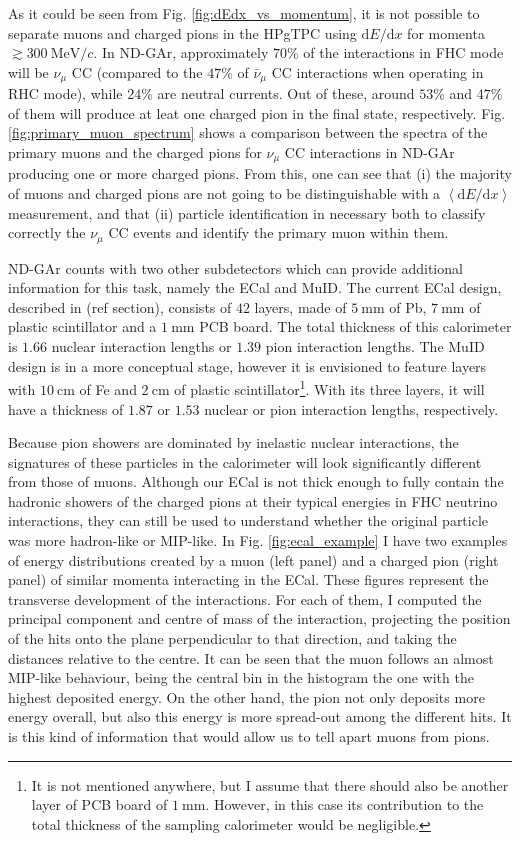 As it could be seen from Fig. \ref{fig:dEdx_vs_momentum}, it is not possible to separate muons and charged pions in the HPgTPC using $\mathrm{d}E/\mathrm{d}x$ for momenta $\gtrsim 300~\mathrm{MeV}/c$. In ND-GAr, approximately $70\%$ of the interactions in FHC mode will be $\nu_{\mu}$ CC (compared to the $47\%$ of $\bar{\nu}_{\mu}$ CC interactions when operating in RHC mode), while $24\%$ are neutral currents. Out of these, around $53\%$ and $47\%$ of them will produce at leat one charged pion in the final state, respectively. Fig. \ref{fig:primary_muon_spectrum} shows a comparison between the spectra of the primary muons and the charged pions for $\nu_{\mu}$ CC interactions in ND-GAr producing one or more charged pions. From this, one can see that (i) the majority of muons and charged pions are not going to be distinguishable with a $\left<\mathrm{d}E/\mathrm{d}x\right>$ measurement, and that (ii) particle identification in necessary both to classify correctly the $\nu_{\mu}$ CC events and identify the primary muon within them.

ND-GAr counts with two other subdetectors which can provide additional information for this task, namely the ECal and MuID. The current ECal design, described in (ref section), consists of $42$ layers, made of $5~\mathrm{mm}$ of Pb, $7~\mathrm{mm}$ of plastic scintillator and a $1~\mathrm{mm}$ PCB board. The total thickness of this calorimeter is $1.66$ nuclear interaction lengths or $1.39$ pion interaction lengths. The MuID design is in a more conceptual stage, however it is envisioned to feature layers with $10~\mathrm{cm}$ of Fe and $2~\mathrm{cm}$ of plastic scintillator\footnote{It is not mentioned anywhere, but I assume that there should also be another layer of PCB board of $1~\mathrm{mm}$. However, in this case its contribution to the total thickness of the sampling calorimeter would be negligible.}. With its three layers, it will have a thickness of $1.87$ or $1.53$ nuclear or pion interaction lengths, respectively.

Because pion showers are dominated by inelastic nuclear interactions, the signatures of these particles in the calorimeter will look significantly different from those of muons. Although our ECal is not thick enough to fully contain the hadronic showers of the charged pions at their typical energies in FHC neutrino interactions, they can still be used to understand whether the original particle was more hadron-like or MIP-like. In Fig. \ref{fig:ecal_example} I have two examples of energy distributions created by a muon (left panel) and a charged pion (right panel) of similar momenta interacting in the ECal. These figures represent the transverse development of the interactions. For each of them, I computed the principal component and centre of mass of the interaction, projecting the position of the hits onto the plane perpendicular to that direction, and taking the distances relative to the centre. It can be seen that the muon follows an almost MIP-like behaviour, being the central bin in the histogram the one with the highest deposited energy. On the other hand, the pion not only deposits more energy overall, but also this energy is more spread-out among the different hits. It is this kind of information that would allow us to tell apart muons from pions.

